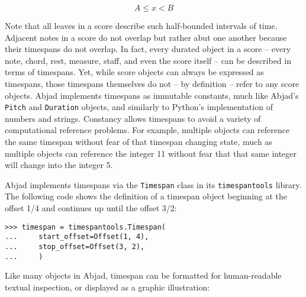 \begin{equation}
A \leq x < B
\end{equation}

Note that all leaves in a score describe such half-bounded intervals of time.
Adjacent notes in a score do not overlap but rather abut one another because
their timespans do not overlap. In fact, every durated object in a score --
every note, chord, rest, measure, staff, and even the score itself -- can be
described in terms of timespans. Yet, while score objects can always be
expressed as timespans, those timespans themselves do not -- by definition
-- refer to any score objects. Abjad implements timespans as immutable
constants, much like Abjad's \texttt{Pitch} and \texttt{Duration} objects, and
similarly to Python's implementation of numbers and strings. Constancy allows
timespans to avoid a variety of computational reference problems. For example,
multiple objects can reference the same timespan without fear of that timespan
changing state, much as multiple objects can reference the integer 11 without
fear that that same integer will change into the integer 5.


Abjad implements timespans via the \texttt{Timespan} class in its
\texttt{timespantools} library. The following code shows the definition of a
timespan object beginning at the offset 1/4 and continues up until the offset
3/2:

\begin{comment}
<abjad>
timespan = timespantools.Timespan(
    start_offset=Offset(1, 4),
    stop_offset=Offset(3, 2),
    )
</abjad>
\end{comment}

\begin{singlespacing}
\vspace{-0.5\baselineskip}
\begin{lstlisting}
>>> timespan = timespantools.Timespan(
...     start_offset=Offset(1, 4),
...     stop_offset=Offset(3, 2),
...     )
\end{lstlisting}
\end{singlespacing}

\noindent Like many objects in Abjad, timespan can be formatted for
human-readable textual inspection, or displayed as a graphic illustration:

\begin{comment}
<abjad>
print(format(timespan))
show(timespan)
</abjad>
\end{comment}

